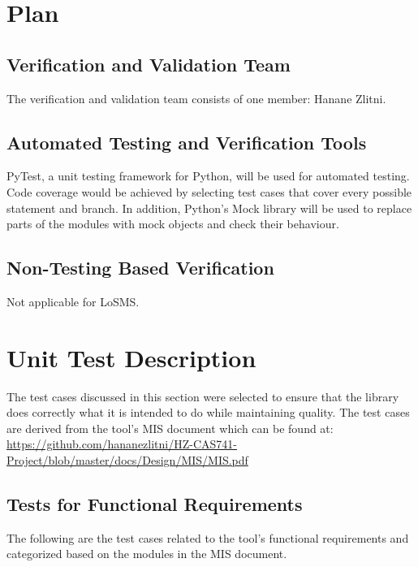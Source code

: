 \documentclass[12pt, titlepage]{article}
\newcommand{\famname}{LoSMS}
\begin{document}

\section{Plan} \label{Plan}
	
\subsection{Verification and Validation Team}

The verification and validation team consists of one member: Hanane Zlitni.

\subsection{Automated Testing and Verification Tools}

PyTest, a unit testing framework for Python, will be used for automated 
testing. Code coverage would be achieved by selecting test cases that cover 
every possible statement and branch. In addition, Python's Mock library will be 
used to replace parts of the modules with mock objects and check their 
behaviour.

\subsection{Non-Testing Based Verification}

Not applicable for \famname{}.

\section{Unit Test Description} \label{UnitTestDescription}

The test cases discussed in this section were selected to ensure that the 
library does correctly what it is intended to do while maintaining quality. The 
test cases are derived from the tool's MIS document which can be found at: 
\url{https://github.com/hananezlitni/HZ-CAS741-Project/blob/master/docs/Design/MIS/MIS.pdf}

\subsection{Tests for Functional Requirements}

The following are the test cases related to the tool's functional requirements 
and categorized based on the modules in the MIS document.
\end{document}
